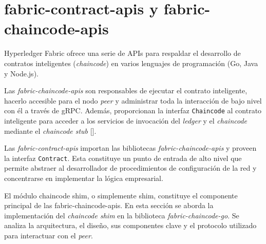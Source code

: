 %
%



\section{fabric-contract-apis y fabric-chaincode-apis}
Hyperledger Fabric ofrece una serie de APIs para respaldar el desarrollo de contratos inteligentes (\textit{chaincode}) en varios lenguajes de programación (Go, Java y Node.js). 

Las \textit{fabric-chaincode-apis} son responsables de ejecutar el contrato inteligente, hacerlo accesible para el nodo \textit{peer} y administrar toda la interacción de bajo nivel con él a través de gRPC. Además, proporcionan la interfaz  \texttt{Chaincode} al contrato inteligente para acceder a los servicios de invocación del \textit{ledger} y el \textit{chaincode} mediante el \textit{chaincode stub} [\cite{hlf-internals}].

Las \textit{fabric-contract-apis} importan las bibliotecas \textit{fabric-chaincode-apis }y  proveen la interfaz \texttt{Contract}. Esta constituye un punto de entrada de alto nivel que permite abstraer al desarrollador de procedimientos de configuración de la red y concentrarse en implementar la lógica empresarial.
%
 
El módulo chaincode shim, o simplemente shim, constituye el componente principal de las fabric-chaincode-apis. En esta sección se aborda la implementación del \textit{chaincode shim} en la biblioteca \textit{fabric-chaincode-go}. Se analiza la arquitectura, el diseño, sus componentes clave y el protocolo utilizado para interactuar con el \textit{peer}.

